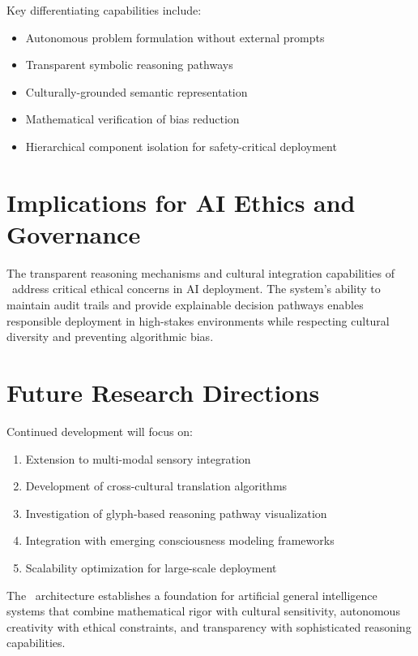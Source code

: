 \documentclass[12pt,twoside,openright]{report}
\begin{document}
Key differentiating capabilities include:
\begin{itemize}
\item Autonomous problem formulation without external prompts
\item Transparent symbolic reasoning pathways
\item Culturally-grounded semantic representation
\item Mathematical verification of bias reduction
\item Hierarchical component isolation for safety-critical deployment
\end{itemize}

\section{Implications for AI Ethics and Governance}

The transparent reasoning mechanisms and cultural integration capabilities of \obiai\ address critical ethical concerns in AI deployment. The system's ability to maintain audit trails and provide explainable decision pathways enables responsible deployment in high-stakes environments while respecting cultural diversity and preventing algorithmic bias.

\section{Future Research Directions}

Continued development will focus on:
\begin{enumerate}
\item Extension to multi-modal sensory integration
\item Development of cross-cultural translation algorithms  
\item Investigation of glyph-based reasoning pathway visualization
\item Integration with emerging consciousness modeling frameworks
\item Scalability optimization for large-scale deployment
\end{enumerate}

The \obiai\ architecture establishes a foundation for artificial general intelligence systems that combine mathematical rigor with cultural sensitivity, autonomous creativity with ethical constraints, and transparency with sophisticated reasoning capabilities.

\appendix
\end{document}
